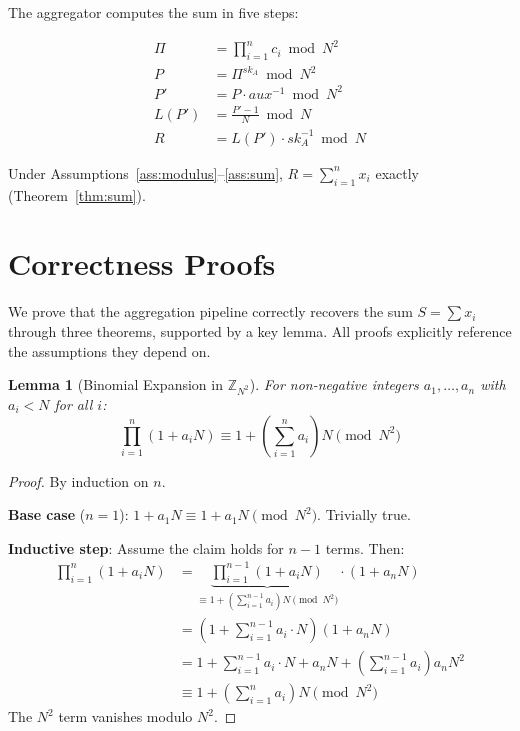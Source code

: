 \documentclass[11pt, a4paper]{article}
\newtheorem{lemma}[theorem]{Lemma}
\begin{document}
The aggregator computes the sum in five steps:

\begin{align}
\Pi &= \prod_{i=1}^{n} c_i \bmod N^2 \label{eq:step1}\\
P &= \Pi^{sk_A} \bmod N^2 \label{eq:step2}\\
P' &= P \cdot aux^{-1} \bmod N^2 \label{eq:step3}\\
L(P') &= \frac{P' - 1}{N} \bmod N \label{eq:step4}\\
R &= L(P') \cdot sk_A^{-1} \bmod N \label{eq:step5}
\end{align}

Under Assumptions~\ref{ass:modulus}--\ref{ass:sum}, $R = \sum_{i=1}^n x_i$ exactly (Theorem~\ref{thm:sum}).

\section{Correctness Proofs}\label{sec:proofs}

We prove that the aggregation pipeline correctly recovers the sum $S = \sum x_i$ through three theorems, supported by a key lemma. All proofs explicitly reference the assumptions they depend on.

\begin{lemma}[Binomial Expansion in $\mathbb{Z}_{N^2}$]\label{lem:binom}
For non-negative integers $a_1, \ldots, a_n$ with $a_i < N$ for all $i$:
$$\prod_{i=1}^{n} (1 + a_i N) \equiv 1 + \left(\sum_{i=1}^{n} a_i\right) N \pmod{N^2}$$
\end{lemma}

\begin{proof}
By induction on $n$.

\textbf{Base case} ($n = 1$): $1 + a_1 N \equiv 1 + a_1 N \pmod{N^2}$. Trivially true.

\textbf{Inductive step}: Assume the claim holds for $n - 1$ terms. Then:
\begin{align*}
\prod_{i=1}^{n}(1 + a_i N) &= \underbrace{\prod_{i=1}^{n-1}(1 + a_i N)}_{\equiv 1 + (\sum_{i=1}^{n-1} a_i) N \pmod{N^2}} \cdot (1 + a_n N) \\
&= \left(1 + \textstyle\sum_{i=1}^{n-1} a_i \cdot N\right)(1 + a_n N) \\
&= 1 + \textstyle\sum_{i=1}^{n-1} a_i \cdot N + a_n N + \left(\textstyle\sum_{i=1}^{n-1} a_i\right) a_n N^2 \\
&\equiv 1 + \left(\textstyle\sum_{i=1}^{n} a_i\right) N \pmod{N^2}
\end{align*}
The $N^2$ term vanishes modulo $N^2$.
\end{proof}
\end{document}
